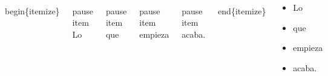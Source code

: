 \documentclass[11pt]{beamer}
\begin{document}
\begin{frame}

\begin{block}{}

\begin{columns}
\begin{semiverbatim}\scriptsize
\\begin\{itemize\}
\end{semiverbatim}

\begin{semiverbatim}\scriptsize
\\pause \\item Lo
\end{semiverbatim}

\begin{semiverbatim}\scriptsize
\\pause \\item que
\end{semiverbatim}

\begin{semiverbatim}\scriptsize
\\pause \\item empieza
\end{semiverbatim}

\begin{semiverbatim}\scriptsize
\\pause \\item acaba.
\end{semiverbatim}

\begin{semiverbatim}\scriptsize
\\end\{itemize\}
\end{semiverbatim}



\begin{itemize}
\pause \item Lo  \pause \item que \pause \item empieza \pause
\item acaba.
\end{itemize}


\end{columns}
\end{block}



\end{frame}
\end{document}
